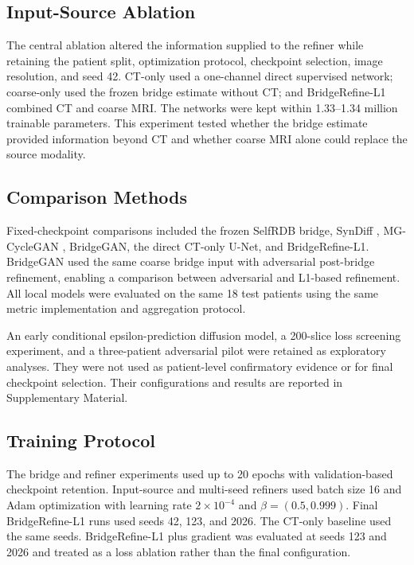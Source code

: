 \subsection{Input-Source Ablation}

The central ablation altered the information supplied to the refiner while retaining the patient split, optimization protocol, checkpoint selection, image resolution, and seed 42. CT-only used a one-channel direct supervised network; coarse-only used the frozen bridge estimate without CT; and BridgeRefine-L1 combined CT and coarse MRI. The networks were kept within 1.33--1.34 million trainable parameters. This experiment tested whether the bridge estimate provided information beyond CT and whether coarse MRI alone could replace the source modality.

\subsection{Comparison Methods}

Fixed-checkpoint comparisons included the frozen SelfRDB bridge, SynDiff \cite{ozbey2023syndiff}, MG-CycleGAN \cite{khalil2025mgcycle}, BridgeGAN, the direct CT-only U-Net, and BridgeRefine-L1. BridgeGAN used the same coarse bridge input with adversarial post-bridge refinement, enabling a comparison between adversarial and L1-based refinement. All local models were evaluated on the same 18 test patients using the same metric implementation and aggregation protocol.

An early conditional epsilon-prediction diffusion model, a 200-slice loss screening experiment, and a three-patient adversarial pilot were retained as exploratory analyses. They were not used as patient-level confirmatory evidence or for final checkpoint selection. Their configurations and results are reported in Supplementary Material.

\subsection{Training Protocol}

The bridge and refiner experiments used up to 20 epochs with validation-based checkpoint retention. Input-source and multi-seed refiners used batch size 16 and Adam optimization with learning rate $2\times10^{-4}$ and $\beta=(0.5,0.999)$. Final BridgeRefine-L1 runs used seeds 42, 123, and 2026. The CT-only baseline used the same seeds. BridgeRefine-L1 plus gradient was evaluated at seeds 123 and 2026 and treated as a loss ablation rather than the final configuration.

